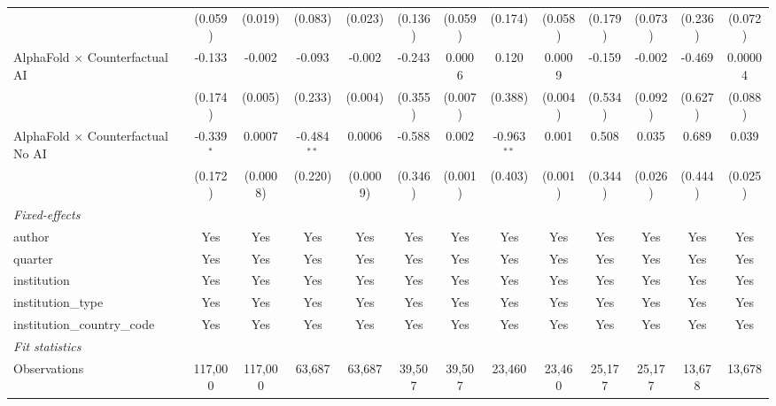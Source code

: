 \begin{tabular}{lcccccccccccc}
                                            & (0.059)      & (0.019)  & (0.083)       & (0.023)  & (0.136) & (0.059) & (0.174)       & (0.058) & (0.179)      & (0.073) & (0.236)     & (0.072)\\   
   AlphaFold $\times$ Counterfactual AI     & -0.133       & -0.002   & -0.093        & -0.002   & -0.243  & 0.0006  & 0.120         & 0.0009  & -0.159       & -0.002  & -0.469      & 0.00004\\   
                                            & (0.174)      & (0.005)  & (0.233)       & (0.004)  & (0.355) & (0.007) & (0.388)       & (0.004) & (0.534)      & (0.092) & (0.627)     & (0.088)\\   
   AlphaFold $\times$ Counterfactual No AI  & -0.339$^{*}$ & 0.0007   & -0.484$^{**}$ & 0.0006   & -0.588  & 0.002   & -0.963$^{**}$ & 0.001   & 0.508        & 0.035   & 0.689       & 0.039\\   
                                            & (0.172)      & (0.0008) & (0.220)       & (0.0009) & (0.346) & (0.001) & (0.403)       & (0.001) & (0.344)      & (0.026) & (0.444)     & (0.025)\\   
   \midrule
   \emph{Fixed-effects}\\
   author                                   & Yes          & Yes      & Yes           & Yes      & Yes     & Yes     & Yes           & Yes     & Yes          & Yes     & Yes         & Yes\\  
   quarter                                  & Yes          & Yes      & Yes           & Yes      & Yes     & Yes     & Yes           & Yes     & Yes          & Yes     & Yes         & Yes\\  
   institution                              & Yes          & Yes      & Yes           & Yes      & Yes     & Yes     & Yes           & Yes     & Yes          & Yes     & Yes         & Yes\\  
   institution\_type                        & Yes          & Yes      & Yes           & Yes      & Yes     & Yes     & Yes           & Yes     & Yes          & Yes     & Yes         & Yes\\  
   institution\_country\_code               & Yes          & Yes      & Yes           & Yes      & Yes     & Yes     & Yes           & Yes     & Yes          & Yes     & Yes         & Yes\\  
   \midrule
   \emph{Fit statistics}\\
   Observations                             & 117,000      & 117,000  & 63,687        & 63,687   & 39,507  & 39,507  & 23,460        & 23,460  & 25,177       & 25,177  & 13,678      & 13,678\\  

\end{tabular}
